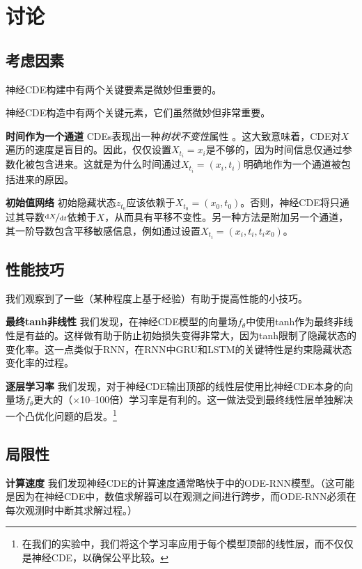 \documentclass{ctexart}
\theoremstyle{plain}
\theoremstyle{definition}
\newcommand{\ttfrac}[2]{\nicefrac{#1}{#2}}
\newcommand{\boldheading}[1]{

\textbf{#1}\quad}
\begin{document}
\section{讨论}
\subsection{考虑因素}
神经CDE构建中有两个关键要素是微妙但重要的。
\begin{rations}
	神经CDE构造中有两个关键元素，它们虽然微妙但非常重要。

	\boldheading{时间作为一个通道}
	CDEs表现出一种\emph{树状不变性}属性 \cite{hambly2010uniqueness}。这大致意味着，CDE对$X$遍历的速度是盲目的。因此，仅仅设置$X_{t_i} = x_i$是不够的，因为时间信息仅通过参数化被包含进来。这就是为什么时间通过$X_{t_i} = (x_i, t_i)$明确地作为一个通道被包括进来的原因。
	
	\boldheading{初始值网络}
	初始隐藏状态$z_{t_0}$应该依赖于$X_{t_0} = (x_0, t_0)$。否则，神经CDE将只通过其导数$\ttfrac{\mathrm{d}X}{\mathrm{d}t}$依赖于$X$，从而具有平移不变性。另一种方法是附加另一个通道，其一阶导数包含平移敏感信息，例如通过设置$X_{t_i} = (x_i, t_i, t_i x_0)$。
	
	\subsection{性能技巧}
	我们观察到了一些（某种程度上基于经验）有助于提高性能的小技巧。
	
	\boldheading{最终tanh非线性}
	我们发现，在神经CDE模型的向量场$f_\theta$中使用tanh作为最终非线性是有益的。这样做有助于防止初始损失变得非常大，因为tanh限制了隐藏状态的变化率。这一点类似于RNN，在RNN中GRU和LSTM的关键特性是约束隐藏状态变化率的过程。
	
	\boldheading{逐层学习率}
	我们发现，对于神经CDE输出顶部的线性层使用比神经CDE本身的向量场$f_\theta$更大的（$\times$10--100倍）学习率是有利的。这一做法受到最终线性层单独解决一个凸优化问题的启发。\footnote{在我们的实验中，我们将这个学习率应用于每个模型顶部的线性层，而不仅仅是神经CDE，以确保公平比较。}
	
	
	\subsection{局限性} \label{section:limitations}
	\boldheading{计算速度}
	我们发现神经CDE的计算速度通常略快于\cite{latent-odes}中的ODE-RNN模型。（这可能是因为在神经CDE中，数值求解器可以在观测之间进行跨步，而ODE-RNN必须在每次观测时中断其求解过程。）
	

\end{rations}
\end{document}
